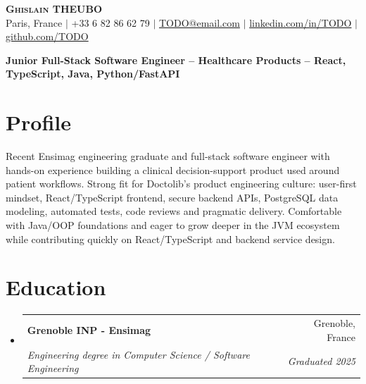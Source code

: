 \documentclass[letterpaper,11pt]{article}
\makeatletter
\newcommand{\resumeSubheading}[4]{
  \vspace{-2pt}\item
    \begin{tabular*}{0.97\textwidth}[t]{l@{\extracolsep{\fill}}r}
      \textbf{#1} & #2 \\
      \textit{\small#3} & \textit{\small #4} \\
    \end{tabular*}\vspace{-7pt}
}
\newcommand{\resumeSubHeadingListStart}{\begin{itemize}[leftmargin=0.15in, label={}]}
\newcommand{\resumeSubHeadingListEnd}{\end{itemize}}
\makeatother
\begin{document}
\begin{center}
    \textbf{\Huge \scshape Ghislain THEUBO} \\ \vspace{2pt}
    \small Paris, France $|$ +33 6 82 86 62 79 $|$
    \href{mailto:TODO@email.com}{TODO@email.com} $|$
    \href{https://www.linkedin.com/in/TODO}{linkedin.com/in/TODO} $|$
    \href{https://github.com/TODO}{github.com/TODO}
\end{center}

\vspace{-8pt}
\begin{center}
    \textbf{Junior Full-Stack Software Engineer -- Healthcare Products -- React, TypeScript, Java, Python/FastAPI}
\end{center}
\vspace{-8pt}

\section{Profile}
\small{
Recent Ensimag engineering graduate and full-stack software engineer with hands-on experience building a clinical decision-support product used around patient workflows. Strong fit for Doctolib's product engineering culture: user-first mindset, React/TypeScript frontend, secure backend APIs, PostgreSQL data modeling, automated tests, code reviews and pragmatic delivery. Comfortable with Java/OOP foundations and eager to grow deeper in the JVM ecosystem while contributing quickly on React/TypeScript and backend service design.
}

\section{Education}
\resumeSubHeadingListStart
  \resumeSubheading
    {Grenoble INP - Ensimag}{Grenoble, France}
    {Engineering degree in Computer Science / Software Engineering}{Graduated 2025}
\resumeSubHeadingListEnd
\end{document}

